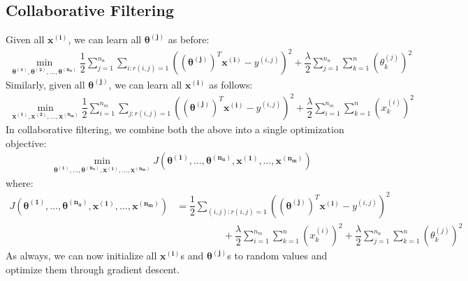 \documentclass[a4paper, 12pt]{article}
\begin{document}
\subsection{Collaborative Filtering}
Given all $\bm{x^{\left(i\right)}}$, we can learn all $\bm{\theta^{\left(j\right)}}$ as before:
\begin{align*}
\min_{\bm{\theta^{\left(1\right)}}, \bm{\theta^{\left(2\right)}}, \dots, \bm{\theta^{\left(n_u\right)}}}\dfrac{1}{2}\sum_{j=1}^{n_u}\sum_{i:r(i,j)=1}\left(\left(\bm{\theta^{\left(j\right)}}\right)^T\bm{x^{\left(i\right)}} - y^{\left(i,j\right)}\right)^2 + \dfrac{\lambda}{2}\sum_{j=1}^{n_u}\sum_{k=1}^{n}\left(\theta_k^{(j)}\right)^2
\end{align*}
Similarly, given all $\bm{\theta^{\left(j\right)}}$, we can learn all $\bm{x^{\left(i\right)}}$ as follows:
\begin{align*}
\min_{\bm{x^{\left(1\right)}}, \bm{x^{\left(2\right)}}, \dots, \bm{x^{\left(n_m\right)}}}\dfrac{1}{2}\sum_{i=1}^{n_m}\sum_{j:r(i,j)=1}\left(\left(\bm{\theta^{\left(j\right)}}\right)^T\bm{x^{\left(i\right)}} - y^{\left(i,j\right)}\right)^2 + \dfrac{\lambda}{2}\sum_{i=1}^{n_m}\sum_{k=1}^{n}\left(x_k^{(i)}\right)^2
\end{align*}
In collaborative filtering, we combine both the above into a single optimization objective:
\begin{align*}
\min_{\bm{\theta^{\left(1\right)}}, \dots, \bm{\theta^{\left(n_u\right)}}, \bm{x^{\left(1\right)}}, \dots, \bm{x^{\left(n_m\right)}}} J\left(\bm{\theta^{\left(1\right)}}, \dots, \bm{\theta^{\left(n_u\right)}}, \bm{x^{\left(1\right)}}, \dots, \bm{x^{\left(n_m\right)}}\right)
\end{align*}
where:
\begin{align*}
J\left(\bm{\theta^{\left(1\right)}}, \dots, \bm{\theta^{\left(n_u\right)}}, \bm{x^{\left(1\right)}}, \dots, \bm{x^{\left(n_m\right)}}\right) &= \dfrac{1}{2}\sum_{(i,j):r(i,j)=1}\left(\left(\bm{\theta^{\left(j\right)}}\right)^T\bm{x^{\left(i\right)}} - y^{\left(i,j\right)}\right)^2 \\
& \hspace{2cm} + \dfrac{\lambda}{2}\sum_{i=1}^{n_m}\sum_{k=1}^{n}\left(x_k^{(i)}\right)^2 + \dfrac{\lambda}{2}\sum_{j=1}^{n_u}\sum_{k=1}^{n}\left(\theta_k^{(j)}\right)^2
\end{align*}
As always, we can now initialize all $\bm{x^{(i)}}$s and $\bm{\theta^{(j)}}$s to random values and optimize them through gradient descent.\\
\break
\end{document}

